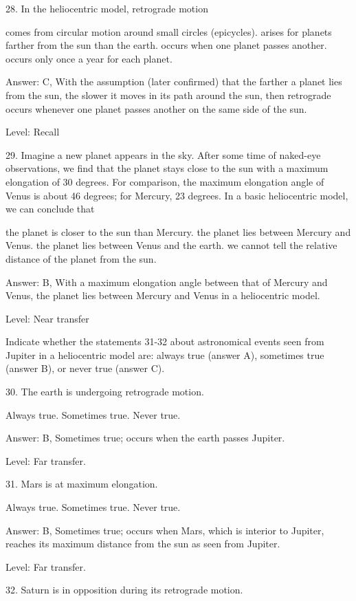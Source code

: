 28. In the heliocentric model, retrograde motion

    comes from circular motion around small circles (epicycles).
    arises for planets farther from the sun than the earth.
    occurs when one planet passes another.
    occurs only once a year for each planet. 

Answer: C, With the assumption (later confirmed) that the farther a planet lies from the sun, the slower it moves in its path around the sun, then retrograde occurs whenever one planet passes another on the same side of the sun.

Level: Recall

29. Imagine a new planet appears in the sky. After some time of naked-eye observations, we find that the planet stays close to the sun with a maximum elongation of 30 degrees. For comparison, the maximum elongation angle of Venus is about 46 degrees; for Mercury, 23 degrees. In a basic heliocentric model, we can conclude that

    the planet is closer to the sun than Mercury.
    the planet lies between Mercury and Venus.
    the planet lies between Venus and the earth.
    we cannot tell the relative distance of the planet from the sun. 

Answer: B, With a maximum elongation angle between that of Mercury and Venus, the planet lies between Mercury and Venus in a heliocentric model.

Level: Near transfer

Indicate whether the statements 31-32 about astronomical events seen from Jupiter in a heliocentric model are: always true (answer A), sometimes true (answer B), or never true (answer C).

30. The earth is undergoing retrograde motion.

    Always true.
    Sometimes true.
    Never true. 

Answer: B, Sometimes true; occurs when the earth passes Jupiter.

Level: Far transfer.

31. Mars is at maximum elongation.

    Always true.
    Sometimes true.
    Never true. 

Answer: B, Sometimes true; occurs when Mars, which is interior to Jupiter, reaches its maximum distance from the sun as seen from Jupiter.

Level: Far transfer.

32. Saturn is in opposition during its retrograde motion.

